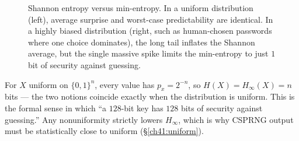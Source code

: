 \begin{figure}[htbp]
\centering
{}
\caption{Shannon entropy versus min-entropy. In a uniform distribution (left), average surprise and worst-case predictability are identical. In a highly biased distribution (right, such as human-chosen passwords where one choice dominates), the long tail inflates the Shannon average, but the single massive spike limits the min-entropy to just $1$ bit of security against guessing.}
\label{ch41:fig-entropy}
\end{figure}


\begin{example}
\label{ch41:ex-keyentropy}
For $X$ uniform on $\{0,1\}^{n}$, every value has $p_x = 2^{-n}$, so
$H(X)=H_\infty(X)=n$ bits --- the two notions coincide exactly when the
distribution is uniform. This is the formal sense in which ``a $128$-bit key has
$128$ bits of security against guessing.'' Any nonuniformity strictly lowers
$H_\infty$, which is why CSPRNG output must be statistically close to uniform
(\S\ref{ch41:uniform}).
\end{example}

